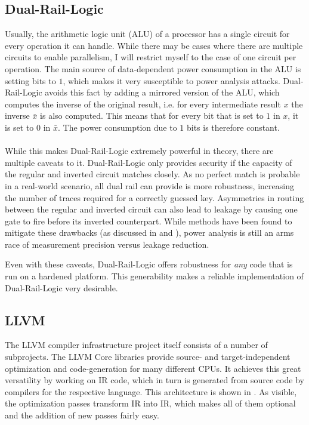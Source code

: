\documentclass{article}
\newcommand{\dual}{Dual-Rail-Logic}
\newcommand{\llvm}{LLVM}
\newcommand{\lc}{\llvm{} Core}
\begin{document}
\subsection{\dual{}}
Usually, the arithmetic logic unit (ALU) of a processor has a single circuit for every operation it can handle.
While there may be cases where there are multiple circuits to enable parallelism, I will restrict myself to the case of one circuit per operation.
The main source of data-dependent power consumption in the ALU is setting bits to $1$, which makes it very susceptible to power analysis attacks.
\dual{} avoids this fact by adding a mirrored version of the ALU, which computes the inverse of the original result, i.e. for every intermediate result $x$ the inverse $\bar{x}$ is also computed.
This means that for every bit that is set to $1$ in $x$, it is set to $0$ in $\bar{x}$.
The power consumption due to $1$ bits is therefore constant.
\\
\\
While this makes \dual{} extremely powerful in theory, there are multiple caveats to it.
\dual{} only provides security if the capacity of the regular and inverted circuit matches closely\cite{tiri2005prototype}.
As no perfect match is probable in a real-world scenario, all dual rail can provide is more robustness, increasing the number of traces required for a correctly guessed key.
Asymmetries in routing between the regular and inverted circuit can also lead to leakage by causing one gate to fire before its inverted counterpart\cite{soares2008evaluating}.
While methods have been found to mitigate these drawbacks (as discussed in \cite{tiri2005prototype} and \cite{soares2008evaluating}), power analysis is still an arms race of measurement precision versus leakage reduction.

Even with these caveats, \dual{} offers robustness for \emph{any} code that is run on a hardened platform.
This generability makes a reliable implementation of \dual{} very desirable.

\subsection{\llvm{}}
The \llvm{} compiler infrastructure project\cite{lattner2004llvm} itself consists of a number of subprojects.
The \lc{} libraries provide source- and target-independent optimization and code-generation for many different CPUs.\cite{lattner2010llvm}
It achieves this great versatility by working on IR code, which in turn is generated from source code by compilers for the respective language.
This architecture is shown in .
As visible, the optimization passes transform IR into IR, which makes all of them optional and the addition of new passes fairly easy.
\end{document}
